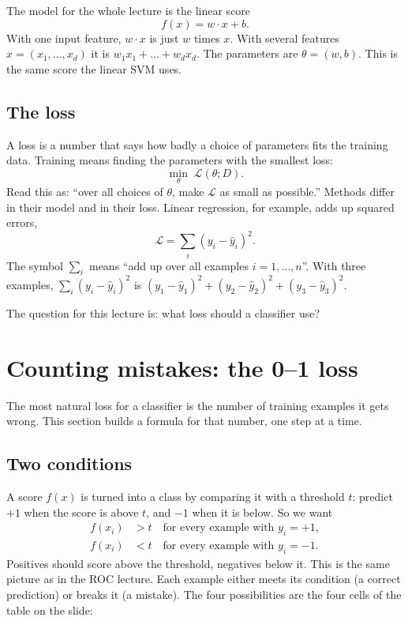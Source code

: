 \documentclass[11pt]{article}
\newcommand{\Loss}{\mathcal{L}}
\begin{document}
The model for the whole lecture is the linear score
\[
  f(x) = w \cdot x + b .
\]
With one input feature, $w \cdot x$ is just $w$ times $x$. With several features
$x = (x_1, \dots, x_d)$ it is $w_1 x_1 + \dots + w_d x_d$. The parameters are $\theta = (w, b)$.
This is the same score the linear SVM uses.

\subsection*{The loss}

A loss is a number that says how badly a choice of parameters fits the training data. Training means
finding the parameters with the smallest loss:
\[
  \min_\theta \; \Loss(\theta; D).
\]
Read this as: ``over all choices of $\theta$, make $\Loss$ as small as possible.'' Methods differ in
their model and in their loss. Linear regression, for example, adds up squared errors,
\[
  \Loss = \sum_i (y_i - \hat y_i)^2 .
\]
The symbol $\sum_i$ means ``add up over all examples $i = 1, \dots, n$''. With three examples,
$\sum_i (y_i - \hat y_i)^2$ is $(y_1 - \hat y_1)^2 + (y_2 - \hat y_2)^2 + (y_3 - \hat y_3)^2$.

The question for this lecture is: what loss should a classifier use?

\section{Counting mistakes: the 0--1 loss}\label{sec:zeroone}

The most natural loss for a classifier is the number of training examples it gets wrong. This section
builds a formula for that number, one step at a time.

\subsection{Two conditions}

A score $f(x)$ is turned into a class by comparing it with a threshold $t$: predict $+1$ when the
score is above $t$, and $-1$ when it is below. So we want
\begin{align*}
  f(x_i) &> t \quad \text{for every example with } y_i = +1, \\
  f(x_i) &< t \quad \text{for every example with } y_i = -1.
\end{align*}
Positives should score above the threshold, negatives below it. This is the same picture as in the
ROC lecture. Each example either meets its condition (a correct prediction) or breaks it (a mistake).
The four possibilities are the four cells of the table on the slide:
\end{document}
